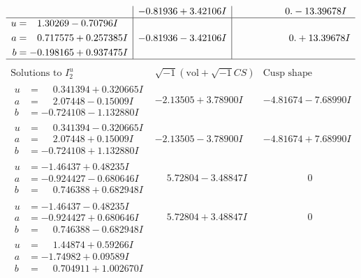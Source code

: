 \documentclass[1p]{elsarticle_modified}
\theoremstyle{definition}
\newcommand{\I}{\sqrt{-1}}
\begin{document}
$$\begin{array}{c|c|c}
 & -0.81936 + 3.42106 I & \phantom{-0.000000 } 0. - 13.39678 I \\ \hline\begin{aligned}
u &= \phantom{-}1.30269 - 0.70796 I \\
a &= \phantom{-}0.717575 + 0.257385 I \\
b &= -0.198165 + 0.937475 I\end{aligned}
 & -0.81936 - 3.42106 I & \phantom{-0.000000 -}0. + 13.39678 I\\
 \hline 
 \end{array}$$\newpage$$\begin{array}{c|c|c}  
\text{Solutions to }I^u_{2}& \I (\text{vol} + \sqrt{-1}CS) & \text{Cusp shape}\\
 \hline 
\begin{aligned}
u &= \phantom{-}0.341394 + 0.320665 I \\
a &= \phantom{-}2.07448 - 0.15009 I \\
b &= -0.724108 - 1.132880 I\end{aligned}
 & -2.13505 + 3.78900 I & -4.81674 - 7.68990 I \\ \hline\begin{aligned}
u &= \phantom{-}0.341394 - 0.320665 I \\
a &= \phantom{-}2.07448 + 0.15009 I \\
b &= -0.724108 + 1.132880 I\end{aligned}
 & -2.13505 - 3.78900 I & -4.81674 + 7.68990 I \\ \hline\begin{aligned}
u &= -1.46437 + 0.48235 I \\
a &= -0.924427 - 0.680646 I \\
b &= \phantom{-}0.746388 + 0.682948 I\end{aligned}
 & \phantom{-}5.72804 - 3.48847 I & \phantom{-0.000000 } 0 \\ \hline\begin{aligned}
u &= -1.46437 - 0.48235 I \\
a &= -0.924427 + 0.680646 I \\
b &= \phantom{-}0.746388 - 0.682948 I\end{aligned}
 & \phantom{-}5.72804 + 3.48847 I & \phantom{-0.000000 } 0 \\ \hline\begin{aligned}
u &= \phantom{-}1.44874 + 0.59266 I \\
a &= -1.74982 + 0.09589 I \\
b &= \phantom{-}0.704911 + 1.002670 I\end{aligned}

\end{array}$$
\end{document}
